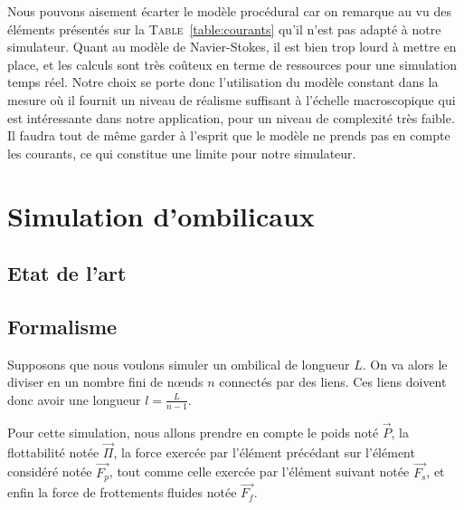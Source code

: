 				Nous pouvons aisement écarter le modèle procédural car on remarque au vu des éléments présentés sur la \textsc{Table}~\ref{table:courants} qu'il n'est pas adapté à notre simulateur. Quant au modèle de Navier-Stokes, il est bien trop lourd à mettre en place, et les calculs sont très coûteux en terme de ressources pour une simulation temps réel. Notre choix se porte donc l'utilisation du modèle constant dans la mesure où il fournit un niveau de réalisme suffisant à l'échelle macroscopique qui est intéressante dans notre application, pour un niveau de complexité très faible. Il faudra tout de même garder à l'esprit que le modèle ne prends pas en compte les courants, ce qui constitue une limite pour notre simulateur.

		\section{Simulation d'ombilicaux}

			\subsection{Etat de l'art}

			\subsection{Formalisme}

				Supposons que nous voulons simuler un ombilical de longueur $L$. On va alors le diviser en un nombre fini de n\oe uds $n$ connectés par des liens. Ces liens doivent donc avoir une longueur $l=\frac{L}{n-1}$.
			
				Pour cette simulation, nous allons prendre en compte le poids noté $\overrightarrow{P}$, la flottabilité notée $\overrightarrow{\Pi}$, la force exercée par l'élément précédant sur l'élément considéré notée $\overrightarrow{F_p}$, tout comme celle exercée par l'élément suivant notée $\overrightarrow{F_s}$, et enfin la force de frottements fluides notée $\overrightarrow{F_f}$.
				
